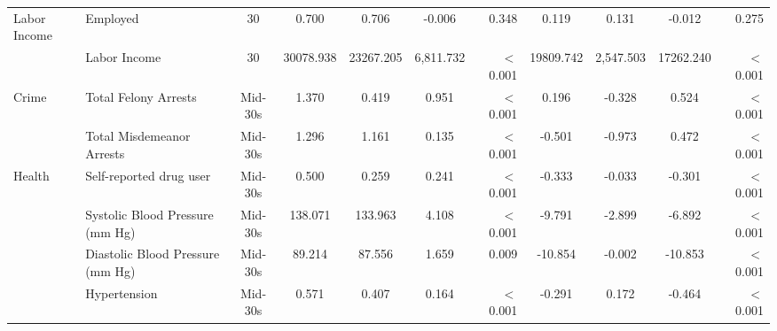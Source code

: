 \begin{tabular}{l l c c c c r c c c r}
Labor Income & Employed & 30 & 0.700 & 0.706 & -0.006 & 0.348 & 0.119 & 0.131 & -0.012 & 0.275 \\
 & Labor Income & 30 & 30078.938 & 23267.205 & 6,811.732 & $ < $ 0.001 & 19809.742 & 2,547.503 & 17262.240 & $ < $ 0.001 \\
Crime & Total Felony Arrests & Mid-30s & 1.370 & 0.419 & 0.951 & $ < $ 0.001 & 0.196 & -0.328 & 0.524 & $ < $ 0.001 \\
 & Total Misdemeanor Arrests & Mid-30s & 1.296 & 1.161 & 0.135 & $ < $ 0.001 & -0.501 & -0.973 & 0.472 & $ < $ 0.001 \\
Health & Self-reported drug user & Mid-30s & 0.500 & 0.259 & 0.241 & $ < $ 0.001 & -0.333 & -0.033 & -0.301 & $ < $ 0.001 \\
 & Systolic Blood Pressure (mm Hg) & Mid-30s & 138.071 & 133.963 & 4.108 & $ < $ 0.001 & -9.791 & -2.899 & -6.892 & $ < $ 0.001 \\
 & Diastolic Blood Pressure (mm Hg) & Mid-30s & 89.214 & 87.556 & 1.659 & 0.009 & -10.854 & -0.002 & -10.853 & $ < $ 0.001 \\
 & Hypertension & Mid-30s & 0.571 & 0.407 & 0.164 & $ < $ 0.001 & -0.291 & 0.172 & -0.464 & $ < $ 0.001 \\
\bottomrule
\end{tabular}
